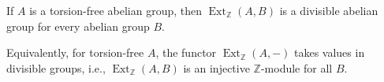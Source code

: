 If $A$ is a torsion-free abelian group, then $\operatorname{Ext}_{\mathbb{Z}}(A, B)$ is a divisible abelian group for every abelian group $B$.

Equivalently, for torsion-free $A$, the functor $\operatorname{Ext}_{\mathbb{Z}}(A, -)$ takes values in divisible groups, i.e., $\operatorname{Ext}_{\mathbb{Z}}(A, B)$ is an injective $\mathbb{Z}$-module for all $B$.
